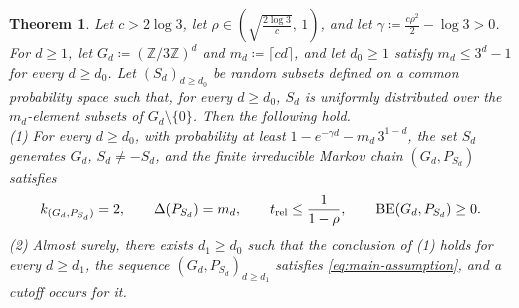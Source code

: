 \documentclass[a4paper, reqno, 11pt]{amsart}
\newtheorem{Thm}{Theorem}[section]
\theoremstyle{definition}
\begin{document}
\begin{Thm}\label{thm:z3d-random}
Let $c > 2 \log 3$, let $\rho \in \left(\sqrt{\frac{2 \log 3}{c}},\, 1\right)$, and let $\gamma \coloneqq \frac{c \rho^{2}}{2} - \log 3 > 0$.
For $d \ge 1$, let $G_{d} \coloneqq (\mathbb{Z}/3\mathbb{Z})^{d}$ and $m_{d} \coloneqq \lceil c d \rceil$,
and let $d_{0} \ge 1$ satisfy $m_{d} \le 3^{d} - 1$ for every $d \ge d_{0}$.
Let $(S_{d})_{d \ge d_{0}}$ be random subsets defined on a common probability space such that, for every $d \ge d_{0}$,
$S_{d}$ is uniformly distributed over the $m_{d}$-element subsets of $G_{d} \setminus \{0\}$.
Then the following hold.\\
(1) For every $d \ge d_{0}$, with probability at least $1 - e^{-\gamma d} - m_{d}\, 3^{1-d}$,
the set $S_{d}$ generates $G_{d}$, $S_{d} \ne -S_{d}$, and the finite irreducible Markov chain $(G_{d}, P_{S_{d}})$ satisfies
\[ k_{(G_{d}, P_{S_{d}})} = 2, \qquad \Delta(P_{S_{d}}) = m_{d}, \qquad t_{\mathrm{rel}} \le \frac{1}{1 - \rho}, \qquad \textup{BE}(G_{d}, P_{S_{d}}) \ge 0. \]
(2) Almost surely, there exists $d_{1} \ge d_{0}$ such that the conclusion of (1) holds for every $d \ge d_{1}$,
the sequence $\left(G_{d}, P_{S_{d}}\right)_{d \ge d_{1}}$ satisfies \eqref{eq:main-assumption}, and a cutoff occurs for it.
\end{Thm}
\end{document}
